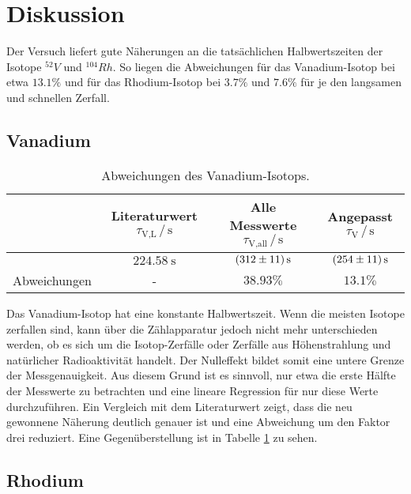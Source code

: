 \section{Diskussion}
\label{sec:Diskussion}

Der Versuch liefert gute Näherungen an die tatsächlichen Halbwertszeiten der Isotope $^{52}V$ und $^{104}Rh$.
So liegen die Abweichungen für das Vanadium-Isotop bei etwa $13.1\%$ und für das Rhodium-Isotop bei $3.7\%$ und $7.6\%$ für je den langsamen und schnellen Zerfall.

\subsection{Vanadium}

\begin{table}
    \centering
    \caption{Abweichungen des Vanadium-Isotops.}
    \label{tab:abwVan}
    \begin{tabular}{c c c c}
        \toprule
         & Literaturwert $\tau_\text{V,L}\,/\,\si{\second}$\cite{perTable} & Alle Messwerte $\tau_\text{V,all}\,/\,\si{\second}$ & Angepasst $\tau_\text{V}\,/\,\si{\second}$ \\
        \midrule
         & $\SI{224.58}{\second}$ & $\SI{312\pm11}{\second}$ & $\SI{254\pm11}{\second}$ \\
        Abweichungen & - & $38.93\%$ & $13.1\%$ \\
        \bottomrule
    \end{tabular}
\end{table}

Das Vanadium-Isotop hat eine konstante Halbwertszeit. Wenn die meisten Isotope zerfallen sind, kann über die Zählapparatur jedoch nicht mehr unterschieden werden,
ob es sich um die Isotop-Zerfälle oder Zerfälle aus Höhenstrahlung und natürlicher Radioaktivität handelt. Der Nulleffekt bildet somit eine untere Grenze der Messgenauigkeit.
Aus diesem Grund ist es sinnvoll, nur etwa die erste Hälfte der Messwerte zu betrachten und eine lineare Regression für nur diese Werte durchzuführen.
Ein Vergleich mit dem Literaturwert zeigt, dass die neu gewonnene Näherung deutlich genauer ist und eine Abweichung um den Faktor drei reduziert.
Eine Gegenüberstellung ist in Tabelle \ref{tab:abwVan} zu sehen.

\subsection{Rhodium}

